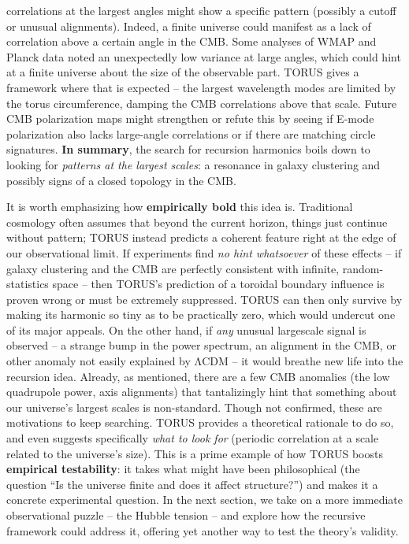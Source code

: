 \documentclass[
]{article}
\begin{document}
correlations at the largest angles might show a specific pattern
(possibly a cutoff or unusual alignments). Indeed, a finite universe
could manifest as a lack of correlation above a certain angle in the
CMB. Some analyses of WMAP and Planck data noted an unexpectedly low
variance at large angles, which could hint at a finite universe about
the size of the observable part. TORUS gives a framework where that is
expected -- the largest wavelength modes are limited by the torus
circumference, damping the CMB correlations above that scale. Future CMB
polarization maps might strengthen or refute this by seeing if E-mode
polarization also lacks large-angle correlations or if there are
matching circle signatures. \textbf{In summary}, the search for
recursion harmonics boils down to looking for \emph{patterns at the
largest scales}: a resonance in galaxy clustering and possibly signs of
a closed topology in the CMB.

It is worth emphasizing how \textbf{empirically bold} this idea is.
Traditional cosmology often assumes that beyond the current horizon,
things just continue without pattern; TORUS instead predicts a coherent
feature right at the edge of our observational limit. If experiments
find \emph{no hint whatsoever} of these effects -- if galaxy clustering
and the CMB are perfectly consistent with infinite, random-statistics
space -- then TORUS's prediction of a toroidal boundary influence is
proven wrong or must be extremely suppressed\hspace{0pt}. TORUS can then
only survive by making its harmonic so tiny as to be practically zero,
which would undercut one of its major appeals. On the other hand, if
\emph{any} unusual largescale signal is observed -- a strange bump in
the power spectrum, an alignment in the CMB, or other anomaly not easily
explained by ΛCDM -- it would breathe new life into the recursion idea.
Already, as mentioned, there are a few CMB anomalies (the low quadrupole
power, axis alignments) that tantalizingly hint that something about our
universe's largest scales is non-standard\hspace{0pt}. Though not
confirmed, these are motivations to keep searching. TORUS provides a
theoretical rationale to do so, and even suggests specifically
\emph{what to look for} (periodic correlation at a scale related to the
universe's size). This is a prime example of how TORUS boosts
\textbf{empirical testability}: it takes what might have been
philosophical (the question ``Is the universe finite and does it affect
structure?'') and makes it a concrete experimental question. In the next
section, we take on a more immediate observational puzzle -- the Hubble
tension -- and explore how the recursive framework could address it,
offering yet another way to test the theory's validity.
\end{document}
